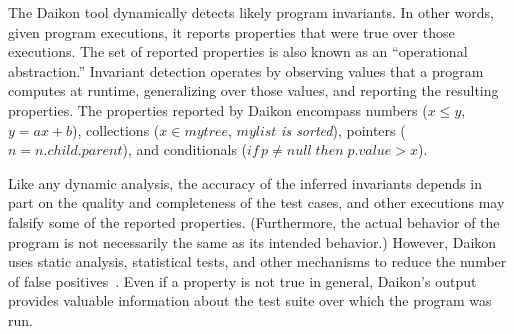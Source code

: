 The Daikon tool dynamically detects likely program invariants.  In
other words, given program executions, it reports properties that were
true over those executions.  The set of reported properties is also
known as an ``operational abstraction.''  Invariant detection operates
by observing values that a program computes at runtime, generalizing
over those values, and reporting the resulting properties.  The
properties reported by Daikon encompass numbers ($x \le y$, $y=ax+b$),
collections ($x \in \mathit{mytree}$, $\mathit{mylist}$ {\it is
  sorted\/}), pointers ($\mathit{n} = \mathit{n.child.parent}$),
and conditionals ($\mathit{if\,} p \neq \mathit{null\; then\; p.value}
> x$).  

Like any dynamic analysis, the accuracy of the inferred invariants
depends in part on the quality and completeness of the test cases, and
other executions may falsify some of the reported properties.
(Furthermore, the actual behavior of the program is not necessarily
the same as its intended behavior.)  However, Daikon uses static
analysis, statistical tests, and other mechanisms to reduce the number
of false positives~\cite{ErnstCGN2000:Relevance}.  Even if a property
is not true in general, Daikon's output provides valuable information
about the test suite over which the program was run.  

